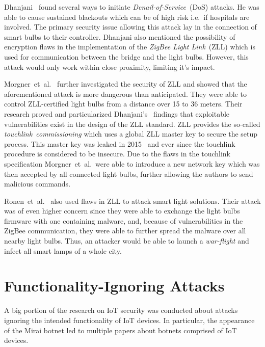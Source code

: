 \documentclass[11pt,a4paper]{article}
\begin{document}
	Dhanjani~\cite{Dhanjani:2013:HLSEPHPWLS} found several ways to initiate \textit{Denail-of-Service}~(DoS) attacks.
	He was able to cause sustained blackouts which can be of high risk i.e.\ if hospitals are involved.
	The primary security issue allowing this attack lay in the connection of smart bulbs to their controller.
	Dhanjani also mentioned the possibility of encryption flaws in the implementation of the \textit{ZigBee Light Link}~(ZLL) which is used for communication between the bridge and the light bulbs. However, this attack would only work within close proximity, limiting it's impact.

	Morgner~et~al.~\cite{Morgner:2016:AYBBUICSSCLS} further investigated the security of ZLL and showed that the aforementioned attack is more dangerous than anticipated.
	They were able to control ZLL-certified light bulbs from a distance over 15 to 36 meters.
	Their research proved and particularized Dhanjani's~\cite{Dhanjani:2013:HLSEPHPWLS} findings that exploitable vulnerabilities exist in the design of the ZLL standard.
ZLL provides the so-called \textit{touchlink~commissioning} which uses a global ZLL master key to secure the setup process.
This master key was leaked in 2015~\cite{Morgner:2016:AYBBUICSSCLS} and ever since the touchlink procedure is considered to be insecure.
Due to the flaws in the touchlink specification Morgner~et~al.\ were able to introduce a new network key which was then accepted by all connected light bulbs, further allowing the authors to send malicious commands.

	Ronen~et~al.~\cite{Ronen:2018:IGNCZCR} also used flaws in ZLL to attack smart light solutions.
	Their attack was of even higher concern since they were able to exchange the light bulbs firmware with one containing malware, and, because of vulnerabilities in the ZigBee communication, they were able to further spread the malware over all nearby light bulbs.
	Thus, an attacker would be able to launch a \textit{war-flight} and infect all smart lamps of a whole city.

	\section{Functionality-Ignoring Attacks}%
	\label{sec:functionality_ignoring_attacks}
	A big portion of the research on IoT security was conducted about attacks ignoring the intended functionality of IoT devices. In particular, the appearance of the Mirai botnet led to multiple papers about botnets comprised of IoT devices.
\end{document}
